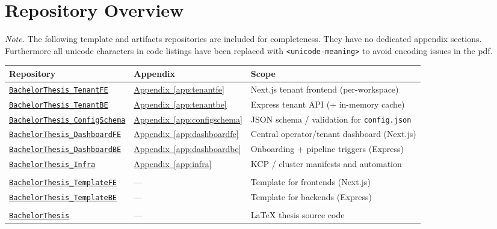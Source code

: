 \documentclass[11pt, a4paper, oneside, listof=totoc]{scrartcl}
\newcommand{\ghowner}{MysterionAutotronic}
\newcommand{\ghrepo}[1]{%
    \href{https://github.com/\ghowner/#1}{\nolinkurl{#1}}%
}
\DeclareRobustCommand{\appref}[1]{\hyperref[#1]{Appendix~\ref*{#1}}}
\begin{document}
        \section{Repository Overview}\label{app:repos-overview}
            \noindent\emph{Note.} The following template and artifacts repositories are included for
            completeness.
            They have no dedicated appendix sections. \\
            Furthermore all unicode characters in code listings have been replaced with
            \texttt{<unicode-meaning>} to avoid encoding issues in the \gls{pdf}.
            \\
            \begin{longtable}{@{}l l P{7.5cm}@{}}
                \toprule
                Repository & Appendix & Scope \\
                \midrule
                \ghrepo{BachelorThesis_TenantFE}     & \appref{app:tenantfe}     & Next.js tenant frontend (per-workspace) \\
                \ghrepo{BachelorThesis_TenantBE}     & \appref{app:tenantbe}     & Express tenant API (+ in-memory cache) \\
                \ghrepo{BachelorThesis_ConfigSchema} & \appref{app:configschema} & JSON schema / validation for \texttt{config.json} \\
                \ghrepo{BachelorThesis_DashboardFE}  & \appref{app:dashboardfe}  & Central operator/tenant dashboard (Next.js) \\
                \ghrepo{BachelorThesis_DashboardBE}  & \appref{app:dashboardbe}  & Onboarding + pipeline triggers (Express) \\
                \ghrepo{BachelorThesis_Infra}        & \appref{app:infra}        & KCP / cluster manifests and automation \\
                \addlinespace
                \\
                \ghrepo{BachelorThesis_TemplateFE}   & —                         & Template for frontends (Next.js) \\
                \ghrepo{BachelorThesis_TemplateBE}   & —                         & Template for backends (Express) \\
                \addlinespace
                \\
                \ghrepo{BachelorThesis}              & —                         & \LaTeX{} thesis source code \\
                \bottomrule
            \end{longtable}
\end{document}
